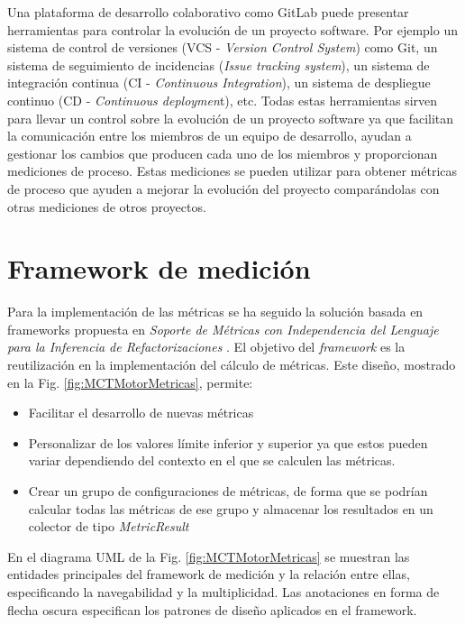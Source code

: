 Una plataforma de desarrollo colaborativo como GitLab puede presentar herramientas para controlar la evolución de un proyecto software. Por ejemplo un sistema de control de versiones (VCS - \textit{Version Control System}) como Git, un sistema de seguimiento de incidencias (\textit{Issue tracking system}), un sistema de integración continua (CI - \textit{Continuous Integration}), un sistema de despliegue continuo (CD - \textit{Continuous deploymen}t), etc.
Todas estas herramientas sirven para llevar un control sobre la evolución de un proyecto software ya que facilitan la comunicación entre los miembros de un equipo de desarrollo, ayudan a gestionar los cambios que producen cada uno de los miembros y proporcionan mediciones de proceso. Estas mediciones se pueden utilizar para obtener métricas de proceso que ayuden a mejorar la evolución del proyecto comparándolas con otras mediciones de otros proyectos.

\section{Framework de medición}

Para la implementación de las métricas se ha seguido la solución basada en frameworks propuesta en \textit{Soporte de Métricas con Independencia del Lenguaje para la Inferencia de Refactorizaciones} \cite{marticorena_soporte_2005}. El objetivo del \textit{framework} es la reutilización en la implementación del cálculo de métricas. Este diseño, mostrado en la Fig. \ref{fig:MCTMotorMetricas}, permite:

\begin{itemize}
	\tightlist
	\item Facilitar el desarrollo de nuevas métricas
	\item Personalizar de los valores límite inferior y superior ya que estos pueden variar dependiendo del contexto en el que se calculen las métricas.
	\item Crear un grupo de configuraciones de métricas, de forma que se podrían calcular todas las métricas de ese grupo y almacenar los resultados en un colector de tipo \textit{MetricResult}
\end{itemize}


En el diagrama UML de la Fig. \ref{fig:MCTMotorMetricas} se muestran las entidades principales del framework de medición y la relación entre ellas, especificando la navegabilidad y la multiplicidad. Las anotaciones en forma de flecha oscura especifican los patrones de diseño\citep{gamma_patrones_2002} aplicados en el framework.

